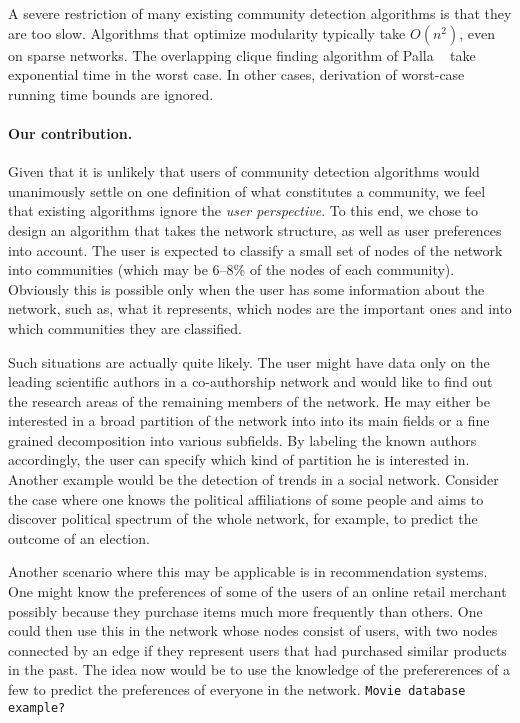 A severe restriction of many existing community detection algorithms 
is that they are too slow. Algorithms that optimize modularity typically 
take $O(n^2)$, even on sparse networks. The overlapping clique finding 
algorithm of Palla \etal~\cite{PDFV05} take exponential time in the worst case.
In other cases, derivation of worst-case running time bounds are ignored. 

\paragraph{Our contribution.}
Given that it is unlikely that users of community detection algorithms 
would unanimously settle on one definition of what constitutes a community, 
we feel that existing algorithms ignore the \emph{user perspective}.
To this end, we chose to design an algorithm that takes the network structure, 
as well as user preferences into account. 
The user is expected to classify a small set of nodes of the network 
into communities (which may be 6--8\% of the nodes of each community).
Obviously this is possible only when the user has some 
information about the network, such as, what it represents, which nodes 
are the important ones and into which communities they are classified. 

Such situations are actually quite likely. The user might have data only 
on the leading scientific authors in a co-authorship network 
and would like to find out the research areas of the remaining members of the network. 
He may either be interested in a broad partition of the network into into its main fields
or a fine grained decomposition into various subfields.
By labeling the known authors accordingly,
the user can specify which kind of partition he is interested in.
Another example would be the detection of trends in a social network.
Consider the case where one knows the political affiliations of some people 
and aims to discover political spectrum of the whole network, 
for example, to predict the outcome of an election. 


Another scenario where this may be applicable is in recommendation systems. 
One might know the preferences of some of the users of an online retail 
merchant possibly because they purchase items much more frequently than others. 
One could then use this in the network whose nodes consist of users, with two 
nodes connected by an edge if they represent users that had purchased similar products in the past. 
The idea now would be to use the knowledge of the prefererences of a few to 
predict the preferences of everyone in the network. 
\texttt{Movie database example?}


